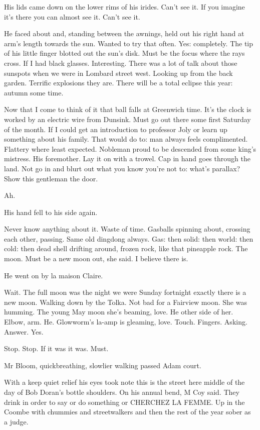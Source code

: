 His lids came down on the lower rims of his irides.
Can't see it.
If you
imagine it's there you can almost see it.
Can't see it.

He faced about and,
standing between the awnings,
held out his right
hand at arm's length towards the sun.
Wanted to try that often.
Yes:
completely.
The tip of his little finger blotted out the sun's disk.
Must
be the focus where the rays cross.
If I had black glasses.
Interesting.
There was a lot of talk about those sunspots when we were in Lombard
street west.
Looking up from the back garden.
Terrific explosions they
are.
There will be a total eclipse this year:
autumn some time.

Now that I come to think of it that ball falls at Greenwich time.
It's
the clock is worked by an electric wire from Dunsink.
Must go out there
some first Saturday of the month.
If I could get an introduction to
professor Joly or learn up something about his family.
That would do to:
man always feels complimented.
Flattery where least expected.
Nobleman
proud to be descended from some king's mistress.
His foremother.
Lay it on
with a trowel.
Cap in hand goes through the land.
Not go in and blurt out
what you know you're not to:
what's parallax?
Show this gentleman the
door.

Ah.

His hand fell to his side again.

Never know anything about it.
Waste of time.
Gasballs spinning
about,
crossing each other,
passing.
Same old dingdong always.
Gas:
then
solid:
then world:
then cold:
then dead shell drifting around,
frozen
rock,
like that pineapple rock.
The moon.
Must be a new moon out,
she
said.
I believe there is.

He went on by la maison Claire.

Wait.
The full moon was the night we were Sunday fortnight exactly
there is a new moon.
Walking down by the Tolka.
Not bad for a Fairview
moon.
She was humming.
The young May moon she's beaming,
love.
He
other side of her.
Elbow,
arm.
He.
Glowworm's la-amp is gleaming,
love.
Touch.
Fingers.
Asking.
Answer.
Yes.

Stop.
Stop.
If it was it was.
Must.

Mr Bloom,
quickbreathing,
slowlier walking passed Adam court.

With a keep quiet relief his eyes took note this is the street here
middle of the day of Bob Doran's bottle shoulders.
On his annual bend,
M Coy said.
They drink in order to say or do something or CHERCHEZ LA
FEMME.
Up in the Coombe with chummies and streetwalkers and then the
rest of the year sober as a judge.

